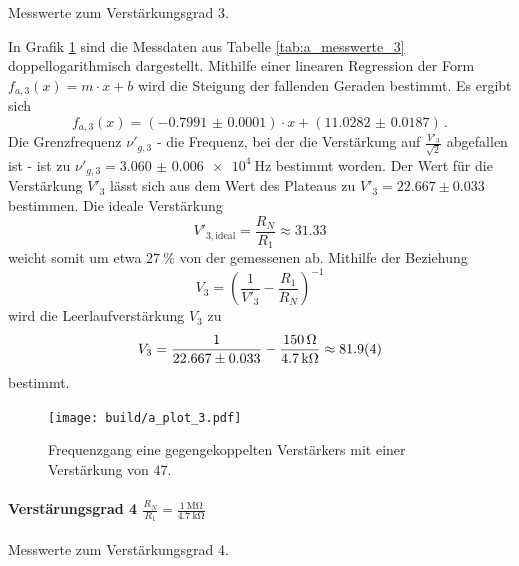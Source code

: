 \begin{table}
\centering
\caption{Messwerte zum Verstärkungsgrad 3.}
    \label{tab:a_messwerte_3}
    
\end{table}

In Grafik \ref{fig:a_plot_3} sind die Messdaten aus Tabelle \ref{tab:a_messwerte_3} doppellogarithmisch dargestellt.
Mithilfe einer linearen Regression der Form $f_{a,3}(x)= m \cdot x + b$ wird die Steigung der fallenden Geraden bestimmt.
Es ergibt sich
\begin{equation*}
    f_{a,3}(x) = (\num{-0.7991(1)}) \cdot x + (\num{11.0282(187)})\,.
\end{equation*}
Die Grenzfrequenz $\nu'_{g,3}$ - die Frequenz, bei der die Verstärkung auf $\frac{V'_3}{\sqrt{2}}$ abgefallen ist - ist zu $\nu'_{g,3} = \SI{3.060(6)e4}{\hertz}$ bestimmt worden.
Der Wert für die Verstärkung $V'_3$ lässt sich aus dem Wert des Plateaus zu $V'_3=22.667\pm0.033$ bestimmen.
Die ideale Verstärkung 
\begin{equation*}
    V'_{3,\text{ideal}} = \frac{R_N}{R_1} \approx 31.33
\end{equation*}
weicht somit um etwa $\SI{27}{\percent}$ von der gemessenen ab.
Mithilfe der Beziehung
\begin{equation*}
    V_3 = \left( \frac{1}{V'_3} - \frac{R_1}{R_N} \right) ^{-1}
\end{equation*}
wird die Leerlaufverstärkung $V_3$ zu
\begin{equation*}
    V_3 = \frac{1}{22.667\pm0.033} - \frac{\SI{150}{\ohm}}{\SI{4.7}{\kilo\ohm}} \approx \num{81.9\pm0.4}
\end{equation*}
bestimmt.

\begin{figure}[h!]
    \centering
    \texttt{[image: build/a\_plot\_3.pdf]}
    \caption{Frequenzgang eine gegengekoppelten Verstärkers mit einer Verstärkung von $47$.}
    \label{fig:a_plot_3}
\end{figure}

\paragraph{Verstärungsgrad 4 $\frac{R_N}{R_1} = \frac{\SI{1}{\mega\ohm}}{\SI{4.7}{\kilo\ohm}}$}

\begin{table}
\centering
\caption{Messwerte zum Verstärkungsgrad 4.}
    \label{tab:a_messwerte_4}
    
\end{table}

